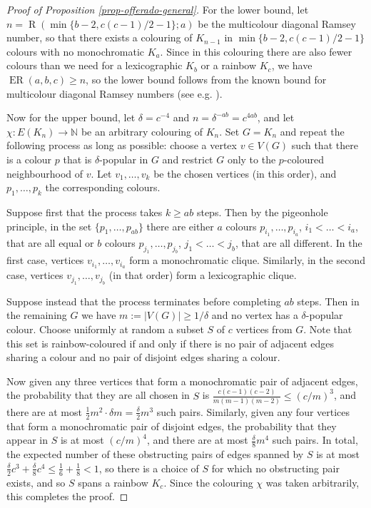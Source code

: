 \documentclass[10pt,a4paper]{article}
\theoremstyle{plain}
\theoremstyle{definition}
\newcommand{\N}{\mathbb{N}}
\newcommand{\offerado}[3]{\operatorname{ER}(#1,#2,#3)}
\begin{document}
\begin{proof}[Proof of Proposition \ref{prop-offerado-general}]
    For the lower bound, let $n=\operatorname{R}(\min\{b-2,c(c-1)/2-1\};a)$ be the multicolour diagonal Ramsey number, so that there exists a colouring of $K_{n-1}$ in $\min\{b-2,c(c-1)/2-1\}$ colours with no monochromatic $K_a$. Since in this colouring there are also fewer colours than we need for a lexicographic $K_b$ or a rainbow $K_c$, we have $\offerado abc\ge n$, so the lower bound follows from the known bound for multicolour diagonal Ramsey numbers (see e.g. \cite{conlon2021lower}).

    Now for the upper bound, let $\delta=c^{-4}$ and $n=\delta^{-ab}=c^{4ab}$, and let $\chi:E(K_n)\to\N$ be an arbitrary colouring of $K_n$. Set $G=K_n$ and repeat the following process as long as possible: choose a vertex $v\in V(G)$ such that there is a colour $p$ that is $\delta$-popular in $G$ and restrict $G$ only to the $p$-coloured neighbourhood of $v$. Let $v_1,\dots,v_k$ be the chosen vertices (in this order), and $p_1,\dots,p_k$ the corresponding colours. 

    Suppose first that the process takes $k\ge ab$ steps. Then by the pigeonhole principle, in the set $\{p_1,\dots,p_{ab}\}$ there are either $a$ colours $p_{i_1},\dots,p_{i_{a}}$, $i_1<\dots< i_{a}$, that are all equal or $b$ colours $p_{j_1},\dots,p_{j_{b}}$, $j_1<\dots<j_{b}$, that are all different. In the first case, vertices $v_{i_1},\dots,v_{i_a}$ form a monochromatic clique. Similarly, in the second case, vertices $v_{j_1},\dots,v_{j_b}$ (in that order) form a lexicographic clique.

    Suppose instead that the process terminates before completing $ab$ steps. Then in the remaining $G$ we have $m:=|V(G)|\ge 1/\delta$ and no vertex has a $\delta$-popular colour. Choose uniformly at random a subset $S$ of $c$ vertices from $G$. Note that this set is rainbow-coloured if and only if there is no pair of adjacent edges sharing a colour and no pair of disjoint edges sharing a colour.
    
    Now given any three vertices that form a monochromatic pair of adjacent edges, the probability that they are all chosen in $S$ is $\frac{c(c-1)(c-2)}{m(m-1)(m-2)}\le(c/m)^3$, and there are at most $\frac{1}{2}m^2\cdot\delta m=\frac{\delta}{2}m^3$ such pairs. Similarly, given any four vertices that form a monochromatic pair of disjoint edges, the probability that they appear in $S$ is at most $(c/m)^4$, and there are at most $\frac{\delta}{8}m^4$ such pairs. In total, the expected number of these obstructing pairs of edges spanned by $S$ is at most $\frac{\delta}{2}c^3+\frac{\delta}{8}c^4\le \frac{1}{6}+\frac{1}{8}<1$, so there is a choice of $S$ for which no obstructing pair exists, and so $S$ spans a rainbow $K_c$. Since the colouring $\chi$ was taken arbitrarily, this completes the proof.
\end{proof}
\end{document}
